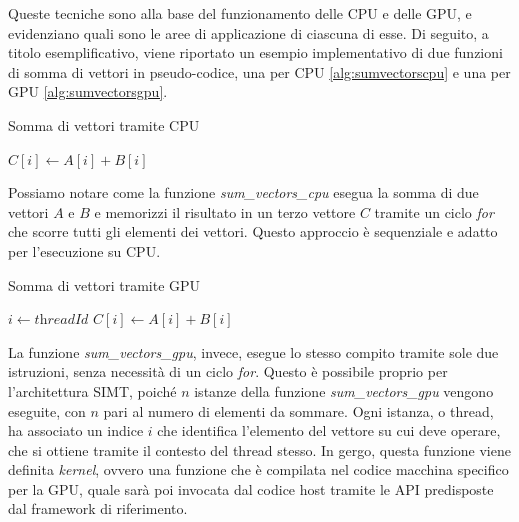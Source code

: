 \vspace{1em}

Queste tecniche sono alla base del funzionamento delle CPU e delle GPU, e
evidenziano quali sono le aree di applicazione di ciascuna di esse. Di seguito,
a titolo esemplificativo, viene riportato un esempio implementativo di due funzioni
di somma di vettori in pseudo-codice, una per CPU \ref{alg:sumvectorscpu} e una
per GPU \ref{alg:sumvectorsgpu}.

\vspace{1em}

\begin{algorithm}
  \caption{Somma di vettori tramite CPU}
  \label{alg:sumvectorscpu}
  \begin{algorithmic}
      \State
    $C[i] \gets A[i] + B[i]$ \EndFor \EndFunction
  \end{algorithmic}
\end{algorithm}

\vspace{1em}

Possiamo notare come la funzione \textit{sum\_vectors\_cpu} esegua la somma di
due vettori $A$ e $B$ e memorizzi il risultato in un terzo vettore $C$ tramite
un ciclo \textit{for} che scorre tutti gli elementi dei vettori. Questo
approccio è sequenziale e adatto per l'esecuzione su CPU.

\vspace{1em}

\begin{algorithm}
  \caption{Somma di vettori tramite GPU}
  \label{alg:sumvectorsgpu}
  \begin{algorithmic}
     \State $i \gets \textit{threadId}$ \State
    $C[i] \gets A[i] + B[i]$ \EndFunction
  \end{algorithmic}
\end{algorithm}

\vspace{1em}

La funzione \textit{sum\_vectors\_gpu}, invece, esegue lo stesso compito tramite
sole due istruzioni, senza necessità di un ciclo \textit{for}. Questo è possibile
proprio per l'architettura SIMT, poiché $n$ istanze della funzione \textit{sum\_vectors\_gpu}
vengono eseguite, con $n$ pari al numero di elementi da sommare. Ogni istanza, o
thread, ha associato un indice $i$ che identifica l'elemento del vettore su cui deve
operare, che si ottiene tramite il contesto del thread stesso. In gergo, questa
funzione viene definita \textit{kernel}, ovvero una funzione che è compilata nel
codice macchina specifico per la GPU, quale sarà poi invocata dal codice host tramite
le API predisposte dal framework di riferimento.

